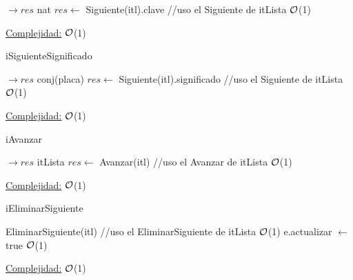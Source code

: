 \begin{Representacion}
\begin{Algoritmos}
\begin{algorithm}[H]
		\begin{algorithmic}[1]
			 $\to res$ nat
			\State $res \leftarrow$ Siguiente(itl).clave //uso el Siguiente de itLista \Comment $\mathcal{O}$(1)
			\EndProcedure 
		\end{algorithmic}
		\underline{Complejidad:} $\mathcal{O}$(1)
	\end{algorithm}
	
	\begin{algorithm}[H]
		\caption{iSiguienteSignificado}
		
		\begin{algorithmic}[1]
			 $\to res$ conj(placa)
			\State $res \leftarrow$ Siguiente(itl).significado //uso el Siguiente de itLista \Comment $\mathcal{O}$(1)
			\EndProcedure 
		\end{algorithmic}
		\underline{Complejidad:} $\mathcal{O}$(1)
	\end{algorithm}
	
	\begin{algorithm}[H]
		\caption{iAvanzar}
		
		\begin{algorithmic}[1]
			 $\to res$ itLista
			\State $res \leftarrow$ Avanzar(itl) //uso el Avanzar de itLista \Comment $\mathcal{O}$(1)
			\EndProcedure 
		\end{algorithmic}
		\underline{Complejidad:} $\mathcal{O}$(1)
	\end{algorithm}
	
	\begin{algorithm}[H]
		\caption{iEliminarSiguiente}
		
		\begin{algorithmic}[1]
			\State EliminarSiguiente(itl) //uso el EliminarSiguiente de itLista \Comment $\mathcal{O}$(1)
			\State e.actualizar $\leftarrow$ true \Comment $\mathcal{O}$(1)
			\EndProcedure 
		\end{algorithmic}
		\underline{Complejidad:} $\mathcal{O}$(1)
	\end{algorithm}	
	
\end{Algoritmos}
\end{Representacion}